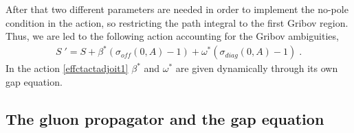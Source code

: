 
After that two different parameters are needed in order to implement the no-pole condition in
the action, so restricting the path integral to the first Gribov region. Thus, we are led to
the following action accounting for the Gribov ambiguities,
\begin{eqnarray}
S\;' = S + \beta^* \left( \sigma_{off}(0,A) - 1 \right) + \omega^* \left( \sigma_{diag}(0,A) - 1 \right)   \;.
\label{effctactadjoit1}
\end{eqnarray}
In the action \eqref{effctactadjoit1} $\beta^*$ and $\omega^*$ are given dynamically through its own gap equation.









\subsection{The gluon propagator and the gap equation}

